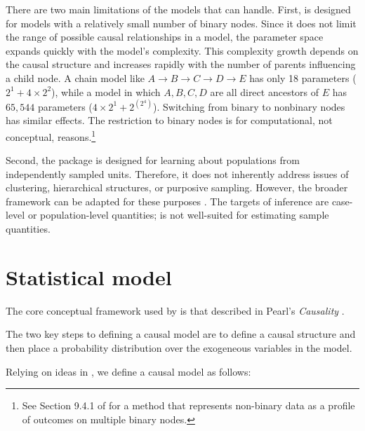 \documentclass[
  11pt,
  article]{jss}
\begin{document}
There are two main limitations of the models that 
can handle. First,  is designed for models with a
relatively small number of binary nodes. Since it does not limit the
range of possible causal relationships in a model, the parameter space
expands quickly with the model's complexity. This complexity growth
depends on the causal structure and increases rapidly with the number of
parents influencing a child node. A chain model like
\(A \rightarrow B \rightarrow C \rightarrow D \rightarrow E\) has only
18 parameters (\(2^1 + 4\times 2^2\)), while a model in which
\(A, B, C, D\) are all direct ancestors of \(E\) has \(65,544\)
parameters (\(4\times 2^1 + 2^{(2^4)}\)). Switching from binary to
nonbinary nodes has similar effects. The restriction to binary nodes is
for computational, not conceptual, reasons.\footnote{See Section 9.4.1
  of \citet{humphreys_integrated_2023} for a method that represents
  non-binary data as a profile of outcomes on multiple binary nodes.}

Second, the package is designed for learning about populations from
independently sampled units. Therefore, it does not inherently address
issues of clustering, hierarchical structures, or purposive sampling.
However, the broader framework can be adapted for these purposes
\citep[see Section 9.4 of][]{humphreys_integrated_2023}. The targets of
inference are case-level or population-level quantities;
 is not well-suited for estimating sample quantities.

\newpage

\section{Statistical model}\label{sec-theory}

The core conceptual framework used by  is that
described in Pearl's \emph{Causality} \citep{pearl_causality_2009}.

The two key steps to defining a causal model are to define a causal
structure and then place a probability distribution over the exogeneous
variables in the model.

Relying on ideas in \citeauthor{pearl_causality_2009}
\citetext{\citeyear{pearl_causality_2009}; \citealp[with notation
from][]{humphreys_integrated_2023}}, we define a causal model as
follows:
\end{document}
